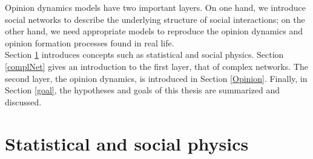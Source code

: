 \documentclass[11 pt , letterpaper , twoside , openright]{book}
\begin{document}
\newline
Opinion dynamics models have two important layers. On one hand, we introduce social networks to describe the underlying structure of social interactions; on the other hand, we need appropriate models to reproduce the opinion dynamics and opinion formation processes found in real life.\\
\newline
Section \ref{statPhys} introduces concepts such as statistical and social physics. Section \ref{complNet} gives an introduction to the first layer, that of complex networks. The second layer, the opinion dynamics, is introduced in Section \ref{Opinion}. Finally, in Section \ref{goal}, the hypotheses and goals of this thesis are summarized and discussed.

\section{Statistical and social physics}\label{statPhys}
\end{document}
